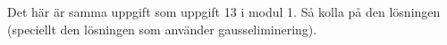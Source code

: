 \documentclass[../../main.tex]{subfiles}
\begin{document}
\begin{solution}{3}

Det här är samma uppgift som uppgift 13 i modul 1. Så kolla på den lösningen (speciellt den lösningen som använder gausseliminering).

\end{solution}
\end{document}
